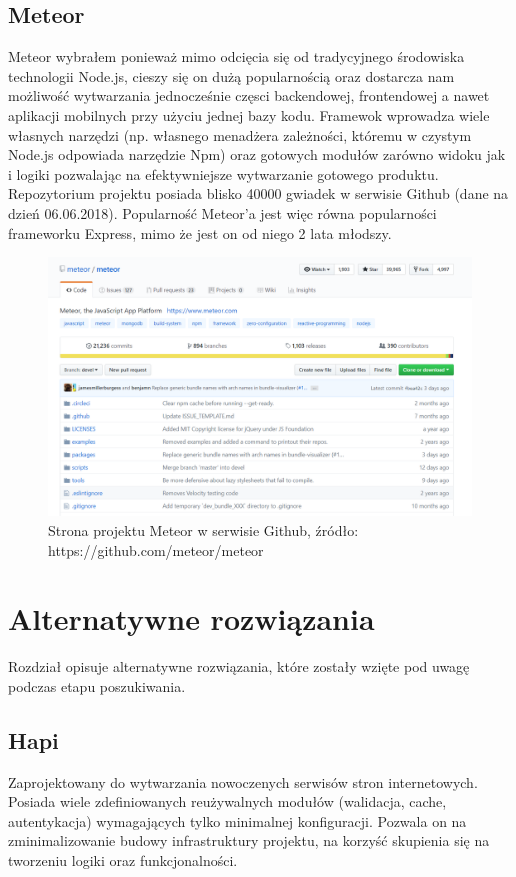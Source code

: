 \documentclass[12pt]{report}
\begin{document}
    \subsection{Meteor}
      Meteor wybrałem ponieważ mimo odcięcia się od tradycyjnego środowiska technologii Node.js, cieszy się on dużą popularnością oraz dostarcza nam możliwość wytwarzania jednocześnie częsci backendowej, frontendowej a nawet aplikacji mobilnych przy użyciu jednej bazy kodu.
      Framewok wprowadza wiele własnych narzędzi (np. własnego menadżera zależności, któremu w czystym Node.js odpowiada narzędzie Npm) oraz gotowych modułów zarówno widoku jak i logiki pozwalając na efektywniejsze wytwarzanie gotowego produktu.
      Repozytorium projektu posiada blisko 40000 gwiadek w serwisie Github (dane na dzień 06.06.2018).
      Popularność Meteor'a jest więc równa popularności frameworku Express, mimo że jest on od niego 2 lata młodszy.
      \begin{figure}[!hb]
        \centering
        \includegraphics[width=\textwidth,height=\textheight,keepaspectratio]{meteor.png} 
        \caption{Strona projektu Meteor w serwisie Github, źródło: https://github.com/meteor/meteor}
      \end{figure}
  
  \section{Alternatywne rozwiązania}
    Rozdział opisuje alternatywne rozwiązania, które zostały wzięte pod uwagę podczas etapu poszukiwania.

    \subsection{Hapi}
    Zaprojektowany do wytwarzania nowoczenych serwisów stron internetowych.
    Posiada wiele zdefiniowanych reużywalnych modułów (walidacja, cache, autentykacja) wymagających tylko minimalnej konfiguracji.
    Pozwala on na zminimalizowanie budowy infrastruktury projektu, na korzyść skupienia się na tworzeniu logiki oraz funkcjonalności.
\end{document}
